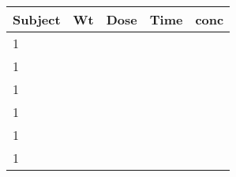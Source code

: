 \begin{table}[H]
 \begin{center}
  \begin{tabular}{lrrrr}
    \hline \hline
   Subject & Wt & Dose & Time & conc \\ \hline
   1 & \verb#79.6# & \verb#4.02# & \verb#0.00# & \verb#0.74# \\
   1 & \verb#79.6# & \verb#4.02# & \verb#0.25# & \verb#2.84# \\
   1 & \verb#79.6# & \verb#4.02# & \verb#0.57# & \verb#6.57# \\
   1 & \verb#79.6# & \verb#4.02# & \verb#1.12# & \verb#10.50# \\
   1 & \verb#79.6# & \verb#4.02# & \verb#2.02# & \verb#9.66# \\
   1 & \verb#79.6# & \verb#4.02# & \verb#3.82# & \verb#8.58# \\ \hline
  \end{tabular}
 \end{center}
\end{table}
